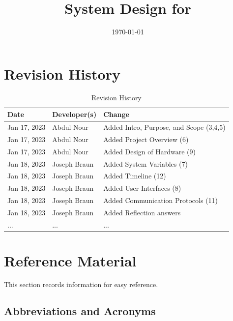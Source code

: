 \documentclass[12pt, titlepage]{article}
\begin{document}
\title{System Design for \progname{}} 
\author{\authname}
\date{\today}

\maketitle


\section{Revision History}

\begin{table}[hp]
\caption{Revision History} \label{TblRevisionHistory}
\begin{tabularx}{\textwidth}{llX}
\toprule
\textbf{Date} & \textbf{Developer(s)} & \textbf{Change}\\
\midrule
Jan 17, 2023 & Abdul Nour & Added Intro, Purpose, and Scope (3,4,5)\\
Jan 17, 2023 & Abdul Nour & Added Project Overview (6)\\
Jan 17, 2023 & Abdul Nour & Added Design of Hardware (9)\\
Jan 18, 2023 & Joseph Braun & Added System Variables (7)\\
Jan 18, 2023 & Joseph Braun & Added Timeline (12)\\
Jan 18, 2023 & Joseph Braun & Added User Interfaces (8)\\
Jan 18, 2023 & Joseph Braun & Added Communication Protocols (11)\\
Jan 18, 2023 & Joseph Braun & Added Reflection answers\\

... & ... & ...\\
\bottomrule
\end{tabularx}
\end{table}

\newpage

\section{Reference Material}

This section records information for easy reference.

\subsection{Abbreviations and Acronyms}
\end{document}
